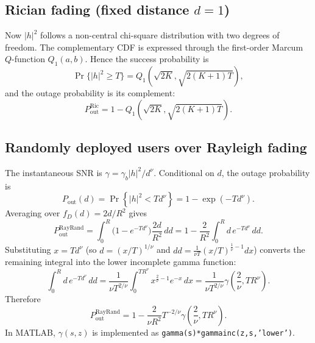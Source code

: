 \documentclass[12pt,a4paper]{article}
\begin{document}
\subsection{Rician fading (fixed distance $d=1$)}
Now $|h|^2$ follows a non-central chi-square distribution with two degrees of freedom. The complementary CDF is expressed through the first-order Marcum $Q$-function $Q_1(a,b)$. Hence the success probability is
\begin{equation}
    \Pr\{|h|^2\ge T\}=Q_1\!\left(\sqrt{2K},\sqrt{2(K+1)T}\right),
\end{equation}
and the outage probability is its complement:
\begin{equation}
    P_{\text{out}}^{\text{Ric}}=1-Q_1\!\left(\sqrt{2K},\sqrt{2(K+1)T}\right).
\end{equation}

\subsection{Randomly deployed users over Rayleigh fading}
The instantaneous SNR is $\gamma=\gamma_b|h|^2/d^{\nu}$. Conditional on $d$, the outage probability is
\begin{equation}
    P_{\text{out}}(d)=\Pr\left\{|h|^2<Td^{\nu}\right\}=1-\exp(-Td^{\nu}).
\end{equation}
Averaging over $f_D(d)=2d/R^2$ gives
\begin{equation}
    P_{\text{out}}^{\text{RayRand}}
    =\int_0^R\bigl(1-e^{-Td^{\nu}}\bigr)\frac{2d}{R^2}\,dd
    =1-\frac{2}{R^2}\int_0^R d\,e^{-Td^{\nu}}\,dd.
\end{equation}
Substituting $x=Td^{\nu}$ (so $d=(x/T)^{1/\nu}$ and $dd=\frac{1}{\nu T}(x/T)^{\frac{1}{\nu}-1}dx$) converts the remaining integral into the lower incomplete gamma function:
\begin{equation}
    \int_0^R d\,e^{-Td^{\nu}}\,dd
    =\frac{1}{\nu T^{2/\nu}}\int_0^{TR^{\nu}}x^{\frac{2}{\nu}-1}e^{-x}\,dx
    =\frac{1}{\nu T^{2/\nu}}\gamma\!\left(\frac{2}{\nu},TR^{\nu}\right).
\end{equation}
Therefore
\begin{equation}
    P_{\text{out}}^{\text{RayRand}}
    =1-\frac{2}{\nu R^2}T^{-2/\nu}\gamma\!\left(\frac{2}{\nu},TR^{\nu}\right).
\end{equation}
In MATLAB, $\gamma(s,z)$ is implemented as \texttt{gamma(s)*gammainc(z,s,'lower')}.
\end{document}
